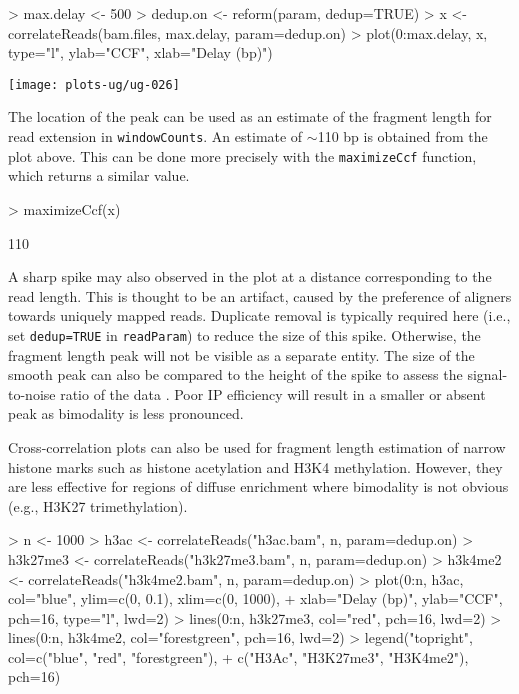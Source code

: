 \documentclass[12pt]{report}
\renewenvironment{Schunk}{\vspace{0pt}}{\vspace{0pt}}
\newcommand{\code}[1]{{\small\texttt{#1}}}
\begin{document}
\begin{Schunk}
\begin{Sinput}
> max.delay <- 500
> dedup.on <- reform(param, dedup=TRUE)
> x <- correlateReads(bam.files, max.delay, param=dedup.on)
> plot(0:max.delay, x, type="l", ylab="CCF", xlab="Delay (bp)")
\end{Sinput}
\end{Schunk}

\begin{center}
\centering
\texttt{[image: plots-ug/ug-026]}
\end{center}

The location of the peak can be used as an estimate of the fragment length for read extension in \code{windowCounts}. 
An estimate of $\sim$110 bp is obtained from the plot above.
This can be done more precisely with the \code{maximizeCcf} function, which returns a similar value.

\begin{Schunk}
\begin{Sinput}
> maximizeCcf(x)
\end{Sinput}
\begin{Soutput}
[1] 110
\end{Soutput}
\end{Schunk}

A sharp spike may also observed in the plot at a distance corresponding to the read length. 
This is thought to be an artifact, caused by the preference of aligners towards uniquely mapped reads. 
Duplicate removal is typically required here (i.e., set \code{dedup=TRUE} in \code{readParam}) to reduce the size of this spike. 
Otherwise, the fragment length peak will not be visible as a separate entity.
The size of the smooth peak can also be compared to the height of the spike to assess the signal-to-noise ratio of the data \citep{landt2012}. 
Poor IP efficiency will result in a smaller or absent peak as bimodality is less pronounced. 

Cross-correlation plots can also be used for fragment length estimation of narrow histone marks such as histone acetylation and H3K4 methylation.
However, they are less effective for regions of diffuse enrichment where bimodality is not obvious (e.g., H3K27 trimethylation).

\begin{Schunk}
\begin{Sinput}
> n <- 1000
> h3ac <- correlateReads("h3ac.bam", n, param=dedup.on)
> h3k27me3 <- correlateReads("h3k27me3.bam", n, param=dedup.on)
> h3k4me2 <- correlateReads("h3k4me2.bam", n, param=dedup.on)
> plot(0:n, h3ac, col="blue", ylim=c(0, 0.1), xlim=c(0, 1000),
+     xlab="Delay (bp)", ylab="CCF", pch=16, type="l", lwd=2)
> lines(0:n, h3k27me3, col="red", pch=16, lwd=2)
> lines(0:n, h3k4me2, col="forestgreen", pch=16, lwd=2)
> legend("topright", col=c("blue", "red", "forestgreen"),
+     c("H3Ac", "H3K27me3", "H3K4me2"), pch=16)
\end{Sinput}
\end{Schunk}
\label{data:ccf}
\end{document}
